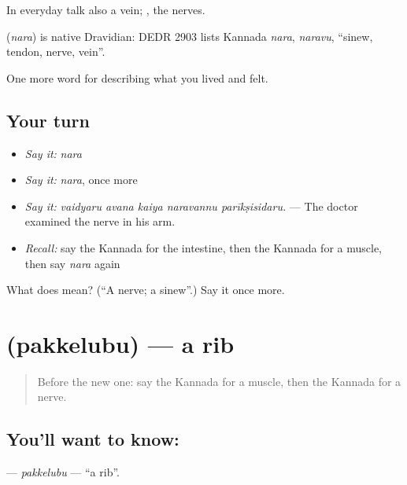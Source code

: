 In everyday talk also a vein; , the nerves.

\begin{cousinweb}
\textbf{} (\emph{nara}) is native Dravidian: DEDR 2903 lists Kannada \emph{nara}, \emph{naravu}, \textquotedblleft{}sinew, tendon, nerve, vein\textquotedblright{}.
\end{cousinweb}

\begin{grammarlens}[title={What you've built}]
One more word for describing what you lived and felt.
\end{grammarlens}

\subsection*{Your turn}
\begin{itemize}
\raggedright
  \item \emph{Say it:} \emph{nara}
  \item \emph{Say it:} \emph{nara}, once more
  \item \emph{Say it:} \emph{vaidyaru avana kaiya naravannu parīkṣisidaru.} — The doctor examined the nerve in his arm.
  \item \emph{Recall:} say the Kannada for the intestine, then the Kannada for a muscle, then say \emph{nara} again
\end{itemize}

\begin{tcolorbox}[breakable,colback=teal!4,colframe=teal!35!black,title={Before you move on}]
What does  mean? (\textquotedblleft{}A nerve; a sinew\textquotedblright{}.) Say it once more.
\end{tcolorbox}
\section[\texorpdfstring{\kn{ಪಕ್ಕೆಲುಬು} (pakkelubu)}{ಪಕ್ಕೆಲುಬು (pakkelubu)}]{ (pakkelubu) — a rib}

\label{lesson:KA-C509-pakkelubu}



\begin{quote}
Before the new one: say the Kannada for a muscle, then the Kannada for a nerve.
\end{quote}

\subsection*{You'll want to know: }
\textbf{} — \emph{pakkelubu} — \textquotedblleft{}a rib\textquotedblright{}.

